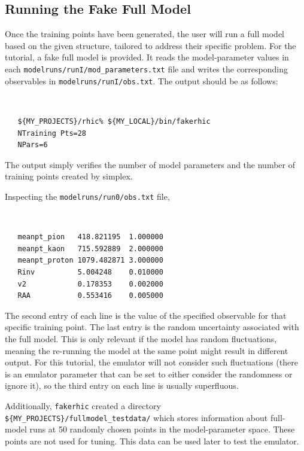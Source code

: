 \documentclass[UserManual.tex]{subfiles}
\begin{document}
\subsection{Running the Fake Full Model}
Once the training points have been generated, the user will run a full model based on the given structure, tailored to address their specific problem. For the tutorial, a fake full model is provided. It reads the model-parameter values in each {\tt modelruns/runI/mod\_parameters.txt} file and writes the corresponding observables in {\tt modelruns/runI/obs.txt}. The output should be as follows:
{\tt
\begin{verbatim}
   ${MY_PROJECTS}/rhic% ${MY_LOCAL}/bin/fakerhic
   NTraining Pts=28
   NPars=6
\end{verbatim}
}
The output simply verifies the number of model parameters and the number of training points created by simplex.

Inspecting the {\tt modelruns/run0/obs.txt} file,
{\tt
\begin{verbatim}
   meanpt_pion   418.821195  1.000000
   meanpt_kaon   715.592889  2.000000
   meanpt_proton 1079.482871 3.000000
   Rinv          5.004248    0.010000
   v2            0.178353    0.002000
   RAA           0.553416    0.005000
\end{verbatim}
}
The second entry of each line is the value of the specified observable for that specific training point. The last entry is the random uncertainty associated with the full model. This is only relevant if the model has random fluctuations, meaning the re-running the model at the same point might result in different output. For this tutorial, the emulator will not consider such fluctuations (there is an emulator parameter that can be set to either consider the randomness or ignore it), so the third entry on each line is usually superfluous. 

Additionally, {\tt fakerhic} created a directory {\tt \$\{MY\_PROJECTS\}/fullmodel\_testdata/} which stores information about full-model runs at 50 randomly chosen points in the model-parameter space. These points are not used for tuning. This data can be used later to test the emulator. 
\end{document}

